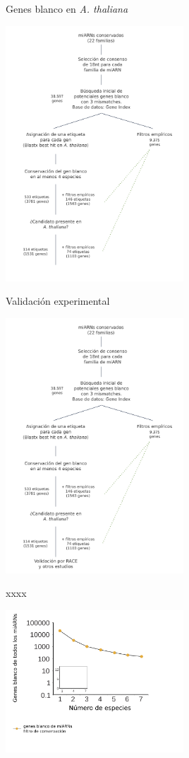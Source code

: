 \documentclass{beamer}
\begin{document}
\begin{frame}{Genes blanco en \textit{A. thaliana}}
	\begin{center}
		\includegraphics[width=0.5\textwidth]{img/NAR_fig1_06.png}
	\end{center}
\end{frame}

\begin{frame}{Validación experimental}
	\begin{center}
		\includegraphics[width=0.5\textwidth]{img/NAR_fig1_07.png}
	\end{center}
\end{frame}

\begin{frame}{xxxx}
	\begin{center}
		\includegraphics[width=0.5\textwidth]{img/NAR_fig2_01.png}
	\end{center}
\end{frame}
\end{document}
